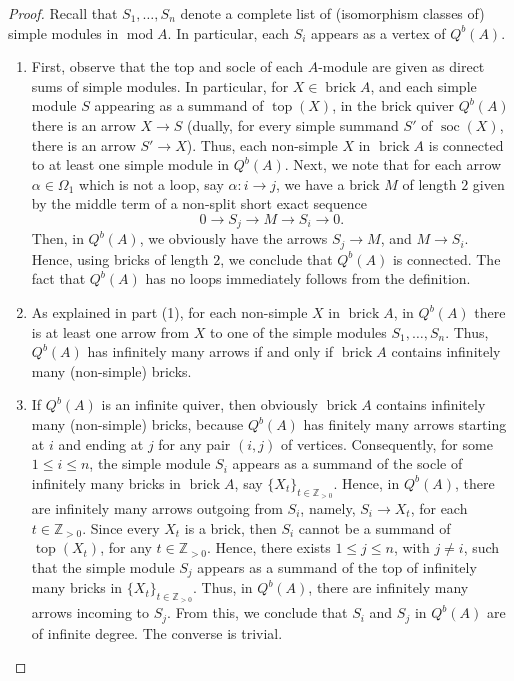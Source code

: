\documentclass[10pt,a4paper]{amsart}
\DeclareMathOperator*{\brick}{brick}
\DeclareMathOperator*{\modu}{mod}
\DeclareMathOperator*{\soc}{soc}
\DeclareMathOperator*{\topm}{top}
\begin{document}
\begin{proof} 
Recall that $S_1, \ldots, S_n$ denote a complete list of (isomorphism classes of) simple modules in $\modu A$. In particular, each $S_i$ appears as a vertex of $Q^b(A)$. 
\begin{enumerate}
    \item First, observe that the top and socle of each $A$-module are given as direct sums of simple modules. In particular, for $X\in \brick A$, and each simple module $S$ appearing as a summand of $\topm(X)$, in the brick quiver $Q^b(A)$ there is an arrow $X \to S$ (dually, for every simple summand $S'$ of $\soc(X)$, there is an arrow $S' \to X$). Thus, each non-simple $X$ in $\brick A$ is connected to at least one simple module in $Q^b(A)$. 
    Next, we note that for each arrow $\alpha \in \Omega_1$ which is not a loop, say $\alpha: i \to j$, we have a brick $M$ of length $2$ given by the middle term of a non-split short exact sequence
    $$0 \to S_j \to M \to S_i \to 0.$$ Then, in $Q^b(A)$, we obviously have the arrows $S_j \to M$, and $M \to S_i$. Hence, using bricks of length $2$, we conclude that $Q^b(A)$ is connected. 
    The fact that $Q^b(A)$ has no loops immediately follows from the definition.

    \item As explained in part (1), for each non-simple $X$ in $\brick A$, in $Q^b(A)$ there is at least one arrow from $X$ to one of the simple modules $S_1, \ldots, S_n$. Thus, $Q^b(A)$ has infinitely many arrows if and only if $\brick A$ contains infinitely many (non-simple) bricks. 

    \item If $Q^b(A)$ is an infinite quiver, then obviously $\brick A$ contains infinitely many (non-simple) bricks, because $Q^b(A)$ has finitely many arrows starting at $i$ and ending at $j$ for any pair $(i,j)$ of vertices.  Consequently, for some $1\leq i \leq n$, the simple module $S_i$ appears as a summand of the socle of infinitely many bricks in $\brick A$, say $\{X_t\}_{t\in \mathbb{Z}_{>0}}$. Hence, in $Q^b(A)$, there are infinitely many arrows outgoing from $S_i$, namely, $S_i \to X_t$, for each ${t\in \mathbb{Z}_{>0}}$. Since every $X_t$ is a brick, then $S_i$ cannot be a summand of $\topm(X_t)$, for any ${t\in \mathbb{Z}_{>0}}$. Hence, there exists $1\leq j \leq n$, with $j\neq i$, such that the simple module $S_j$ appears as a summand of the top of infinitely many bricks in $\{X_t\}_{t\in \mathbb{Z}_{>0}}$. Thus, in $Q^b(A)$, there are infinitely many arrows incoming to $S_j$. From this, we conclude that $S_i$ and $S_j$ in  $Q^b(A)$ are of infinite degree. The converse is trivial.


\end{enumerate}
\end{proof}
\end{document}
